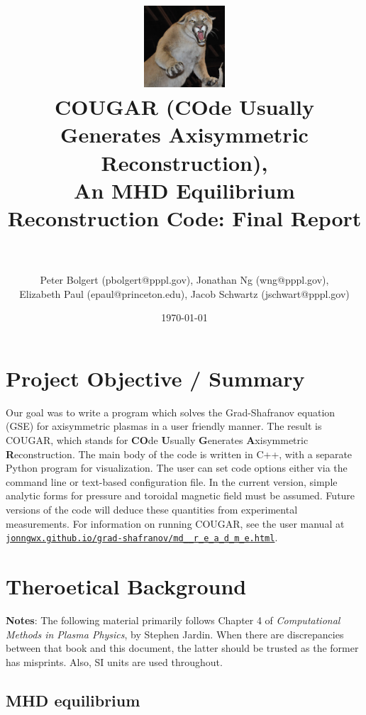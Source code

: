 \documentclass[paper=letter, fontsize=11pt]{scrartcl} %
\title{	
\includegraphics[width=3cm]{Cougar_Nevada}
\normalfont \normalsize 
\horrule{0.5pt} \\[0.4cm] %
\LARGE COUGAR (\textbf{CO}de \textbf{U}sually \textbf{G}enerates \textbf{A}xisymmetric \textbf{R}econstruction), \\ \Large An MHD Equilibrium Reconstruction Code: Final Report\\ %
\horrule{2pt} \\[0.5cm] %
}
\author{Peter Bolgert (pbolgert@pppl.gov), Jonathan Ng (wng@pppl.gov), \\ Elizabeth Paul (epaul@princeton.edu), Jacob Schwartz (jschwart@pppl.gov)} %
\date{\normalsize\today} %
\begin{document}
\maketitle %


\section{Project Objective / Summary}

Our goal was to write a program which solves the Grad-Shafranov equation (GSE) for axisymmetric plasmas in a user friendly manner.  The result is COUGAR, which stands for \textbf{CO}de \textbf{U}sually \textbf{G}enerates \textbf{A}xisymmetric \textbf{R}econstruction.  The main body of the code is written in C++, with a separate Python program for visualization.  The user can set code options either via the command line or text-based configuration file.  In the current version, simple analytic forms for pressure and toroidal magnetic field must be assumed.  Future versions of the code will deduce these quantities from experimental measurements.  For information on running COUGAR, see the user manual at \href{http://jonngwx.github.io/grad-shafranov/md__r_e_a_d_m_e.html}{\nolinkurl{jonngwx.github.io/grad-shafranov/md__r_e_a_d_m_e.html}}.


\section{Theroetical Background}

\textbf{Notes}: The following material primarily follows Chapter 4 of \textit{Computational Methods in Plasma Physics}, by Stephen Jardin.  When there are discrepancies between that book and this document, the latter should be trusted as the former has misprints.  Also, SI units are used throughout.

\subsection{MHD equilibrium}
\end{document}
